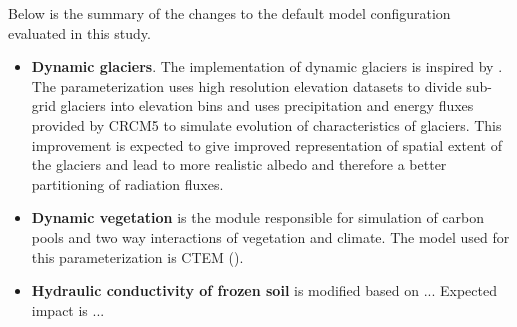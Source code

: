 \documentclass[a0b,landscape]{a0poster}
\begin{document}
\begin{multicols*}{4}
\vspace{0.5cm}
\noindent
{}

\vspace{0.5cm}

Below is the summary of the changes to the default model configuration evaluated in this study.
\begin{itemize}
  \item \textbf{Dynamic glaciers}. The implementation of dynamic glaciers is inspired by \citet{kotlarski2009}. The parameterization
  uses high resolution elevation datasets to divide sub-grid glaciers into elevation bins and uses
  precipitation and energy fluxes provided by CRCM5 to simulate evolution of characteristics of glaciers.
  This improvement is expected to give improved representation of spatial extent of the glaciers and lead to
  more realistic albedo and therefore a better partitioning of radiation fluxes.

  \item \textbf{Dynamic vegetation} is the module responsible for simulation of carbon pools and
  two way interactions of vegetation and climate. The model used for this parameterization is CTEM ().

  \item \textbf{Hydraulic conductivity of frozen soil} is modified based on ... Expected impact is ...
\end{itemize}










\end{multicols*}
\end{document}
